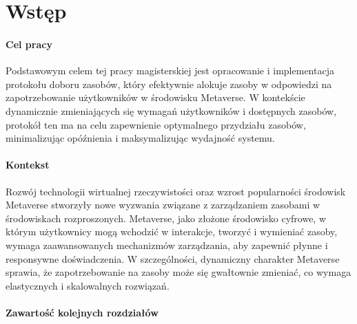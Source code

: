 \chapter{Wstęp}

\subsubsection{Cel pracy}

Podstawowym celem tej pracy magisterskiej jest opracowanie i implementacja protokołu doboru zasobów, który efektywnie alokuje zasoby w odpowiedzi na zapotrzebowanie użytkowników w środowisku Metaverse. W kontekście dynamicznie zmieniających się wymagań użytkowników i dostępnych zasobów, protokół ten ma na celu zapewnienie optymalnego przydziału zasobów, minimalizując opóźnienia i maksymalizując wydajność systemu. 

\subsubsection{Kontekst}

Rozwój technologii wirtualnej rzeczywistości oraz wzrost popularności środowisk Metaverse stworzyły nowe wyzwania związane z zarządzaniem zasobami w środowiskach rozproszonych. Metaverse, jako złożone środowisko cyfrowe, w którym użytkownicy mogą wchodzić w interakcje, tworzyć i wymieniać zasoby, wymaga zaawansowanych mechanizmów zarządzania, aby zapewnić płynne i responsywne doświadczenia. W szczególności, dynamiczny charakter Metaverse sprawia, że zapotrzebowanie na zasoby może się gwałtownie zmieniać, co wymaga elastycznych i skalowalnych rozwiązań.


\subsubsection{Zawartość kolejnych rozdziałów}
